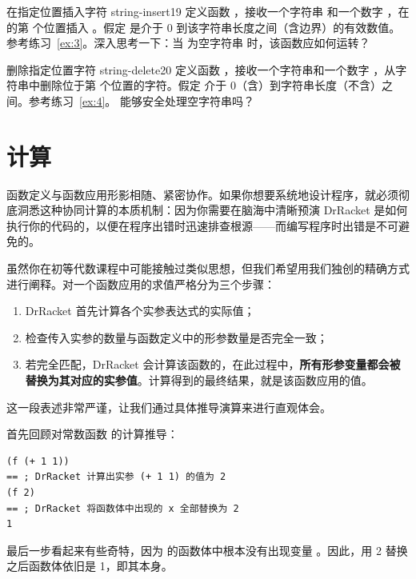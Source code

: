 \begin{exercise}{在指定位置插入字符 string-insert}{19}
定义函数 ，接收一个字符串  和一个数字 ，在  的第  个位置插入 。假定  是介于 0 到该字符串长度之间（含边界）的有效数值。参考练习~\ref{ex:3}。深入思考一下：当  为空字符串  时，该函数应如何运转？
\end{exercise}

\begin{exercise}{删除指定位置字符 string-delete}{20}
定义函数 ，接收一个字符串和一个数字 ，从字符串中删除位于第  个位置的字符。假定  介于 0（含）到字符串长度（不含）之间。参考练习~\ref{ex:4}。 能够安全处理空字符串吗？
\end{exercise}


\section{计算}
\label{sec:2.2}

函数定义与函数应用形影相随、紧密协作。如果你想要系统地设计程序，就必须彻底洞悉这种协同计算的本质机制：因为你需要在脑海中清晰预演 DrRacket 是如何执行你的代码的，以便在程序出错时迅速排查根源——而编写程序时出错是不可避免的。

虽然你在初等代数课程中可能接触过类似思想，但我们希望用我们独创的精确方式进行阐释。对一个函数应用的求值严格分为三个步骤：
\begin{enumerate}
  \item DrRacket 首先计算各个实参表达式的实际值；
  \item 检查传入实参的数量与函数定义中的形参数量是否完全一致；
  \item 若完全匹配，DrRacket 会计算该函数的，在此过程中，\textbf{所有形参变量都会被替换为其对应的实参值}。计算得到的最终结果，就是该函数应用的值。
\end{enumerate}

这一段表述非常严谨，让我们通过具体推导演算来进行直观体会。

首先回顾对常数函数  的计算推导：
\begin{lstlisting}[language=BSL]
(f (+ 1 1))
== ; DrRacket 计算出实参 (+ 1 1) 的值为 2
(f 2)
== ; DrRacket 将函数体中出现的 x 全部替换为 2
1
\end{lstlisting}
最后一步看起来有些奇特，因为  的函数体中根本没有出现变量 。因此，用 2 替换  之后函数体依旧是 1，即其本身。

